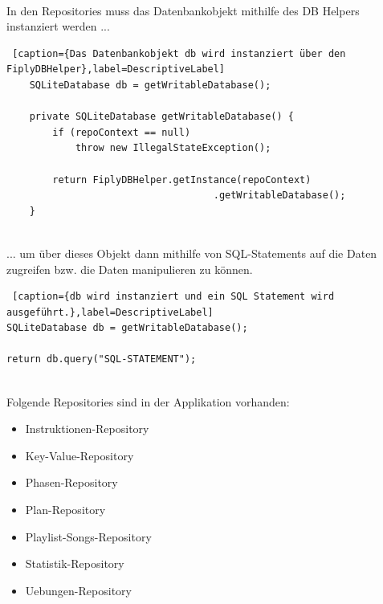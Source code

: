 \documentclass[FIPLY_base.tex]{subfiles}
\begin{document}
\ \\
In den Repositories muss das Datenbankobjekt mithilfe des DB Helpers instanziert werden ...
\ \\
\begin{lstlisting} [caption={Das Datenbankobjekt db wird instanziert über den FiplyDBHelper},label=DescriptiveLabel]
    SQLiteDatabase db = getWritableDatabase();

    private SQLiteDatabase getWritableDatabase() {
        if (repoContext == null) 
            throw new IllegalStateException();
	  
        return FiplyDBHelper.getInstance(repoContext)
			      	  		        .getWritableDatabase();
    }
\end{lstlisting}
\ \\
... um über dieses Objekt dann mithilfe von SQL-Statements auf die Daten zugreifen bzw. die Daten manipulieren zu können.
\ \\
\begin{lstlisting} [caption={db wird instanziert und ein SQL Statement wird ausgeführt.},label=DescriptiveLabel]
SQLiteDatabase db = getWritableDatabase();

return db.query("SQL-STATEMENT");
\end{lstlisting}

\ \\
Folgende Repositories sind in der Applikation vorhanden:
\begin{itemize}
\item Instruktionen-Repository
\item Key-Value-Repository
\item Phasen-Repository
\item Plan-Repository
\item Playlist-Songs-Repository
\item Statistik-Repository
\item Uebungen-Repository
\end{itemize}
\end{document}
